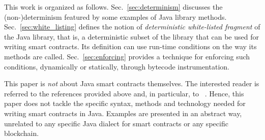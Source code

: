 This work is organized as follows.
Sec.~\ref{sec:determinism} discusses the (non-)determinism featured by some
examples of Java library methods.
Sec.~\ref{sec:white_listing} defines the notion of \emph{deterministic white-listed fragment} of the Java library,
that is, a deterministic subset of the library that can be used for writing smart contracts.
Its definition can use run-time conditions on the way its methods are called.
Sec.~\ref{sec:enforcing} provides a technique for enforcing such conditions, dynamically
or statically, through bytecode instrumentation.

This paper is \emph{not} about Java smart contracts themselves. The interested reader
is referred to the references provided above and, in particular, to ~\cite{Spoto19}.
Hence, this paper does not tackle
the specific syntax, methods and technology needed for writing smart contracts in Java.
Examples are presented in an abstract way, unrelated to any specific
Java dialect for smart contracts or any specific blockchain.
